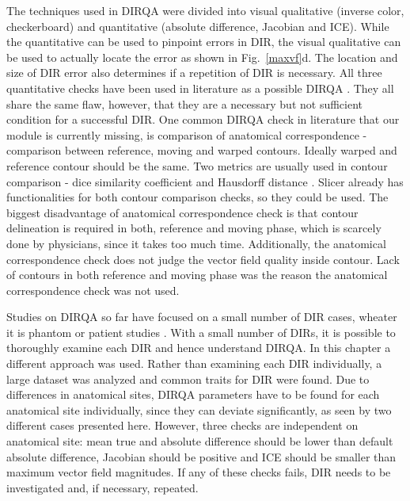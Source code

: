 The techniques used in DIRQA were divided into visual qualitative (inverse color, checkerboard) and quantitative (absolute difference, Jacobian and ICE). While the quantitative can be used to pinpoint errors in DIR, the visual qualitative
can be used to actually locate the error as shown in Fig.~\ref{maxvf}d. The location and size of DIR error also determines if a repetition of DIR is necessary.
All three quantitative checks have been used in literature as a possible DIRQA \cite{Varadhan2013, Leow2007, Christensen2001, Bender2009}.
They all share the same flaw, however, that they are a necessary but not sufficient condition for a successful DIR. 
One common DIRQA check in literature that our module is currently missing, is comparison of anatomical correspondence - 
comparison between reference, moving and warped contours. Ideally warped and reference contour should be the same. Two metrics are usually used in contour comparison -
dice similarity coefficient \cite{Varadhan2013} and Hausdorff distance \cite{Huttenlocher1993}. Slicer already has functionalities for both contour comparison checks, so they could be used. 
The biggest disadvantage of anatomical correspondence check is that contour delineation is required in both, reference and moving phase, which is scarcely done by physicians, 
since it takes too much time. Additionally, the anatomical correspondence check does not judge the vector field quality inside contour.
Lack of contours in both reference and moving phase was the reason the anatomical correspondence check was not used.

Studies on DIRQA so far have focused on a small number of DIR cases, wheater it is phantom \cite{Mutic2001,Moore2004} or patient studies \cite{Wu2008, Varadhan2013}. With a small number of DIRs,
it is possible to thoroughly examine each DIR and hence understand DIRQA. In this chapter a different approach was
used. Rather than examining each DIR individually, a large dataset was analyzed and common traits for DIR were found. Due to differences in anatomical sites, 
DIRQA parameters have to be found for each anatomical site individually, since they can
deviate significantly, as seen by two different cases presented here. However, three checks are independent on anatomical site: mean true and absolute difference should be lower than 
default absolute difference, Jacobian should be positive and ICE should be smaller than maximum vector field magnitudes. 
If any of these checks fails, DIR needs to be investigated and, if necessary, repeated.


